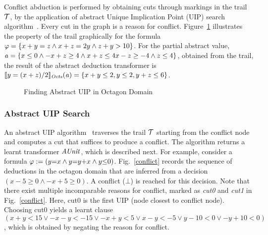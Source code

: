 Conflict abduction is performed by obtaining cuts through markings in the 
trail $\mathcal{T}$, by the application of abstract Unique Implication Point (UIP) 
search algorithm~\cite{uip,cdcl}.  Every cut in the graph is a reason for conflict. 
%
Figure~\ref{conflict-oct} illustrates the property of the trail 
graphically for the formula $\varphi= \{x+y=z \wedge x+z=2y \wedge z+y>10\}$.
For the partial abstract value, 
$\mathit{a}=\{x\leq0 \wedge -x+z\geq4 \wedge x+z\leq4 x-z\geq-4 \wedge z\leq4\}$, 
obtained from the trail, the result of the abstract deduction transformer is
$\llbracket y=(x+z)/2 \rrbracket_{\mathit{Octs}}(\mathit{a})=\{x+y\leq2, y\leq2, y+z\leq6\}$.
%
\begin{figure}[htbp]
\centering
{}
\caption{\label{conflict-oct} Finding Abstract UIP in Octagon Domain}
\end{figure}  
%
\subsubsection{Abstract UIP Search}
An abstract UIP algorithm~\cite{DBLP:journals/fmsd/BrainDGHK14} 
traverses the trail $\mathcal{T}$ starting from the conflict node and 
computes a cut that suffices to produce a conflict.  The algorithm 
returns a learnt transformer $\mathit{AUnit}$, which is described next. 
For example, consider a formula $\varphi:= (y{=}x \wedge y{=}y{+}x \wedge y {\leq} 0)$. 
Fig.~\ref{conflict} records the sequence of deductions in the octagon domain 
that are inferred from a decision $(x{-}5 {\geq} 0 \wedge {-}x{+}5 {\geq} 0)$.  
A conflict ($\bot$) is reached for this decision.   
Note that there exist multiple incomparable reasons for conflict,
marked as {\em cut0} and {\em cut1} in Fig.~\ref{conflict}.  Here, cut0 is 
the first UIP (node closest to conflict node).  Choosing cut0 yields 
a learnt clause $(x+y<15 \vee -x-y<-15 \vee -x+y<5 \vee x-y<-5 \vee y-10<0 \vee -y+10<0)$, 
which is obtained by negating the reason for conflict.  
%    
